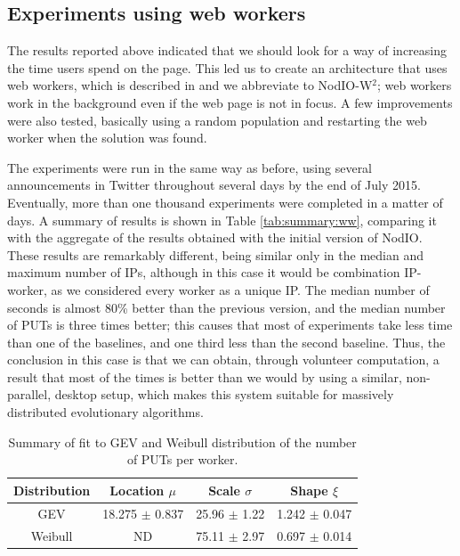 \documentclass{sig-alternate}
\begin{document}
\subsection{Experiments using web workers}
\label{sec:w2}

The results reported above indicated that we should look for a way of
increasing the time users spend on the page. This led us to create an
architecture that uses web workers, which is described in
\cite{2016arXiv160101607Manom} and we abbreviate to {\sf
  NodIO-W$^2$}; web workers work in the background even if
the web page is not in focus. A few improvements were also tested,
basically using a random population and restarting the web worker when
the solution was found.

The experiments were run in the same way as before, using several
 announcements in Twitter throughout several days by the end of July
2015. Eventually, more than one thousand experiments were completed in
a matter of days. A summary of results is shown in Table
\ref{tab:summary:ww}, comparing it with the aggregate of the results
obtained with the initial version of {\sf NodIO}. These results are
remarkably different, being similar only in the median and maximum
number of IPs, although in this case it would be combination
IP-worker, as we considered every worker as a unique IP. The median
number of seconds is almost 80\% better than the previous version, and
the median number of PUTs is three times better; this causes that most
of experiments take less time than one of the baselines, and one third
less than the second baseline. Thus, the conclusion in this case is
that we can obtain, through volunteer computation, a result that most 
of the times is better than we would by using a similar, non-parallel,
desktop setup, which makes this system suitable for massively
distributed evolutionary algorithms.
%
\begin{table}
\caption{Summary of fit to GEV and Weibull distribution of
  the number of PUTs per worker. \label{tab:puts:ww}}
\begin{center}
\begin{tabular}{cccc}
\hline
Distribution & Location $\mu$ & Scale $\sigma$ & Shape $\xi$ \\
\hline
GEV & 18.275 $\pm$ 0.837  &  25.96  $\pm$ 1.22 & 1.242   $\pm$ 0.047 \\
Weibull & ND & 75.11 $\pm$ 2.97  & 0.697 $\pm$ 0.014 \\
\hline
\end{tabular}
\end{center}
\end{table}
%
\end{document}
